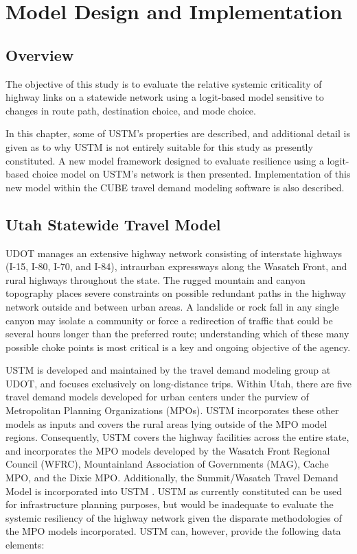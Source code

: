 \chapter{Model Design and Implementation}
\label{chp:chapter3}
\graphicspath{{figures/}{figures/chapter3/}}

\section{Overview} \label{Overview}

The objective of this study is to evaluate the relative systemic
criticality of highway links on a statewide network using a logit-based model
sensitive to changes in route path, destination choice, and mode choice.

In this chapter, some of USTM's properties are described, and additional detail is given as to why
USTM is not entirely suitable for this study as presently constituted. A new
model framework designed to evaluate resilience using a logit-based choice model on
USTM's network is then presented. Implementation of this new model within the CUBE travel demand
modeling software is also described.

\section{Utah Statewide Travel Model} \label{Utah Statewide Travel Model}

UDOT manages an extensive highway
network consisting of interstate highways (I-15, I-80, I-70, and I-84),
intraurban expressways along the Wasatch Front, and rural highways throughout
the state. The rugged mountain and canyon topography places
severe constraints on possible redundant paths in the highway network outside and between urban areas. A
landslide or rock fall in any single canyon may isolate a community or force a
redirection of traffic that could be several hours longer than the preferred
route; understanding which of these many possible choke points is most
critical is a key and ongoing objective of the agency.

USTM is developed and maintained by
the travel demand modeling group at UDOT, and focuses exclusively on
long-distance trips. Within Utah, there are five travel
demand models developed for urban centers under the purview of  Metropolitan
Planning Organizations (MPOs). USTM incorporates these other models as inputs and covers
the rural areas lying outside of the MPO model regions. Consequently, USTM covers the
highway facilities across the entire state, and incorporates the MPO models
developed by the Wasatch Front Regional Council (WFRC), Mountainland
Association of Governments (MAG), Cache MPO, and the Dixie MPO. Additionally,
the Summit/Wasatch Travel Demand Model is incorporated into USTM \citep{udot2021}.
USTM as currently
constituted can be used for infrastructure planning purposes, but would be
inadequate to evaluate the systemic resiliency of the highway network given
the disparate methodologies of the MPO models incorporated. USTM can, however, provide the
following data elements:

